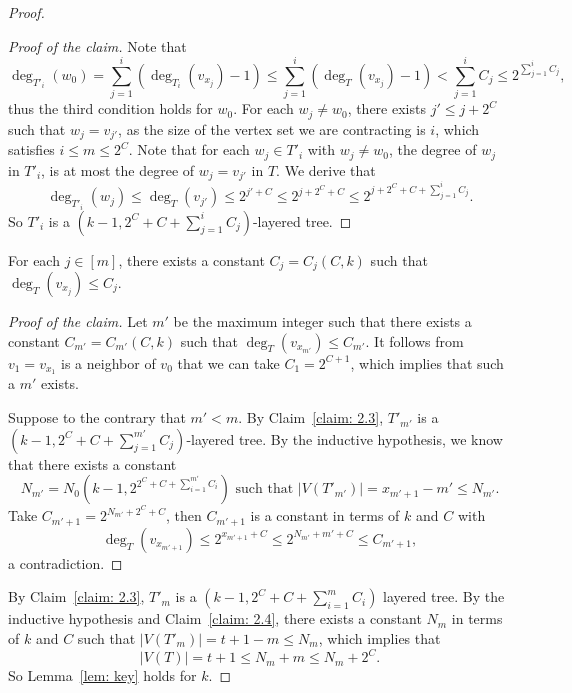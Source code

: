\documentclass[10pt,a4paper]{amsart}
\newenvironment{poc}{\begin{proof}[Proof of the claim]\renewcommand*{\qedsymbol}{$\blacksquare$}}{\end{proof}}
\begin{document}
\begin{proof}
\begin{poc}
    Note that
        \[
        \deg_{T'_i}(w_0) = \sum_{j=1}^{i} \left(\deg_{T_i}(v_{x_j}) -1 \right) \le \sum_{j=1}^{i} \left(\deg_{T}(v_{x_j}) -1 \right) < \sum^{i}_{j=1}C_j\le 2^{\sum^{i}_{j=1}C_j}, 
        \]
        thus the third condition holds for $w_0$.
        For each $w_j \ne w_0$, there exists $j' \le j+2^C$ such that $w_j =v_{j'}$, as the size of the vertex set we are contracting is $i$, which satisfies $i\le m \le 2^C$.
        Note that for each $w_j \in T'_i$ with $w_j\ne w_0$, the degree of $w_j$ in $T'_i$, is at most the degree of $w_j=v_{j'}$ in $T$.
        We derive that
        \[
        \deg_{T'_i}(w_j)\le \deg_{T}(v_{j'})\le 2^{j'+C} \le 2^{j+2^C+C} \le  2^{j+2^C + C + \sum^{i}_{j=1}C_j}.
        \]
        So $T'_i$ is a $(k-1,2^C + C + \sum^{i}_{j=1}C_j)$-layered tree.
    \end{poc}
    \begin{claim}\label{claim: 2.4}
        For each $j\in [m]$, there exists a constant $C_j=C_j(C,k)$ such that $\deg_T(v_{x_j}) \le C_j$.
    \end{claim}
    \begin{poc}
        Let $m'$ be the maximum integer such that there exists a constant $C_{m'}=C_{m'}(C,k)$ such that $\deg_T(v_{x_{m'}}) \le C_{m'}$. It follows from $v_1=v_{x_1}$ is a neighbor of $v_0$ that we can take $C_1 = 2^{C+1}$, which implies that such a $m'$ exists.

        Suppose to the contrary that $m' <m$. By Claim~\ref{claim: 2.3}, $T'_{m'}$ is a $(k-1,2^C + C + \sum^{m'}_{j=1}C_j)$-layered tree.
        By the inductive hypothesis, we know that there exists a constant \[N_{m'} = N_0\left(k-1,2^{2^C + C + \sum^{m'}_{i=1}C_i}\right) \text{ such that }
        |V(T'_{m'})| = x_{m'+1}-m' \le N_{m'}.\] 
        Take $C_{m'+1} = 2^{N_{m'} +2^C+C} $, then $C_{m'+1}$ is a constant in terms of $k$ and $C$ with
        \[\deg_{T}(v_{x_{m'+1}}) \le 2^{x_{m'+1}+C} \le 2^{N_{m'}+m'+C} \le C_{m'+1}, \]
        a contradiction.
    \end{poc}
    By Claim~\ref{claim: 2.3}, $T'_m$ is a $(k-1,2^C + C + \sum^{m}_{i=1}C_i)$ layered tree. 
    By the inductive hypothesis and Claim~\ref{claim: 2.4}, there exists a constant $N_m$ in terms of $k$ and $C$ such that $|V(T'_m)| = t+1-m \le N_m$, which implies that
    \[
    |V(T)| = t+1 \le N_m+m \le N_m+2^C.
    \]
    So Lemma~\ref{lem: key} holds for $k$.
\end{proof}
\end{document}
